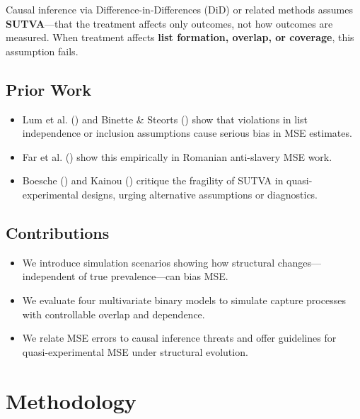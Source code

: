 \documentclass[
  12pt,
]{article}
\providecommand{\tightlist}{%
  \setlength{\itemsep}{0pt}\setlength{\parskip}{0pt}}\usepackage{longtable,booktabs,array}
\theoremstyle{plain}
\theoremstyle{definition}
\begin{document}
Causal inference via Difference-in-Differences (DiD) or related methods
assumes \textbf{SUTVA}---that the treatment affects only outcomes, not
how outcomes are measured. When treatment affects \textbf{list
formation, overlap, or coverage}, this assumption fails.

\subsection{Prior Work}\label{prior-work}

\begin{itemize}
\tightlist
\item
  Lum et al. () and Binette \&
  Steorts () show that violations
  in list independence or inclusion assumptions cause serious bias in
  MSE estimates.\\
\item
  Far et al. () show this empirically
  in Romanian anti-slavery MSE work.\\
\item
  Boesche () and Kainou
  () critique the fragility of SUTVA
  in quasi-experimental designs, urging alternative assumptions or
  diagnostics.
\end{itemize}

\subsection{Contributions}\label{contributions}

\begin{itemize}
\tightlist
\item
  We introduce simulation scenarios showing how structural
  changes---independent of true prevalence---can bias MSE.
\item
  We evaluate four multivariate binary models to simulate capture
  processes with controllable overlap and dependence.
\item
  We relate MSE errors to causal inference threats and offer guidelines
  for quasi-experimental MSE under structural evolution.
\end{itemize}

\section{Methodology}\label{methodology}
\end{document}
